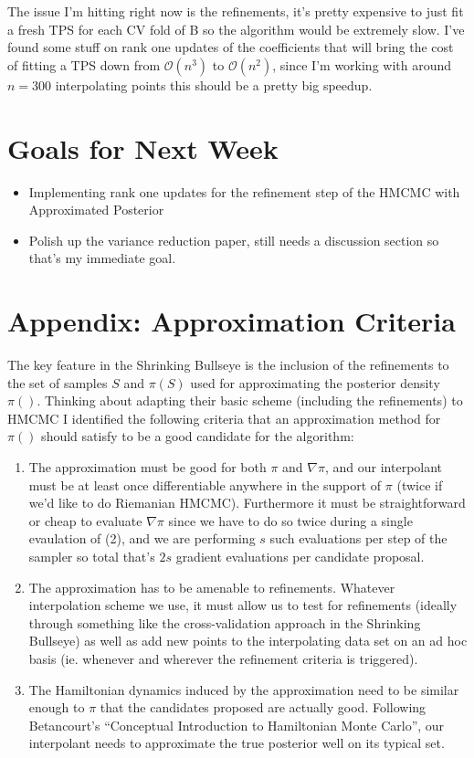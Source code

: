 \documentclass[12pt,a4paper]{article}
\begin{document}
The issue I'm hitting right now is the refinements, it's pretty expensive to just fit a fresh TPS for each CV fold of B so the algorithm would be extremely slow.  I've found some stuff on rank one updates of the coefficients that will bring the cost of fitting a TPS down from $\mathcal{O}(n^3)$ to $\mathcal{O}(n^2)$, since I'm working with around $n = 300$ interpolating points this should be a pretty big speedup.

\section{Goals for Next Week}
\begin{itemize}
\item Implementing rank one updates for the refinement step of the HMCMC with Approximated Posterior
\item Polish up the variance reduction paper, still needs a discussion section so that's my immediate goal.
\end{itemize}

\section{Appendix: Approximation Criteria}
The key feature in the Shrinking Bullseye is the inclusion of the refinements to the set of samples $S$ and $\pi(S)$ used for approximating the posterior density $\pi()$.  Thinking about adapting their basic scheme (including the refinements) to HMCMC I identified the following criteria that an approximation method for $\pi()$ should satisfy to be a good candidate for the algorithm:
\begin{enumerate}
\item The approximation must be good for both $\pi$ and $\nabla \pi$, and our interpolant must be at least once differentiable anywhere in the support of $\pi$ (twice if we’d like to do Riemanian HMCMC). Furthermore it must be straightforward or cheap to evaluate $\nabla \pi$ since we have to do so twice during a single evaulation of (2), and we are performing $s$ such evaluations per step of the sampler so total that’s $2s$ gradient evaluations per candidate proposal.
\item The approximation has to be amenable to refinements. Whatever interpolation scheme  we use, it must allow us to test for refinements (ideally through something like the cross-validation approach in the Shrinking Bullseye) as well as add new points to the interpolating data set on an ad hoc basis (ie. whenever and wherever the refinement criteria is triggered).
\item  The Hamiltonian dynamics induced by the approximation  need to be similar enough to $\pi$ that the candidates proposed are actually good. Following Betancourt’s “Conceptual Introduction to Hamiltonian Monte Carlo”, our interpolant needs to approximate the true posterior well on its typical set.
\end{enumerate}
\end{document}
